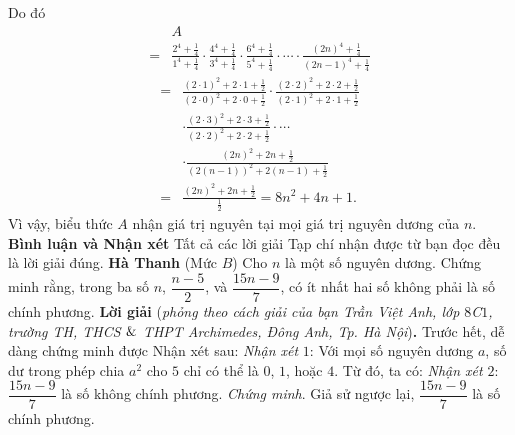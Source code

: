 \begin{multicols}{2}
	\vskip 0.05cm
	Do đó
	\begin{align*}
			&A \\[-0.6ex]
			= &\frac{{{2^4} \!+\! \frac{1}{4}}}{{{1^4} \!+\! \frac{1}{4}}} \!\cdot\! \frac{{{4^4} \!+\! \frac{1}{4}}}{{{3^4} \!+\! \frac{1}{4}}} \!\cdot\! \frac{{{6^4} \!+\! \frac{1}{4}}}{{{5^4} \!+\! \frac{1}{4}}} \cdot  \cdots  \cdot \frac{{{{\left( {2n} \right)}^4} \!+\! \frac{1}{4}}}{{{{\left( {2n \!-\! 1} \right)}^4} \!+\! \frac{1}{4}}}
		\end{align*}
			\begin{align*}
			 = &\frac{{{{\left( {2 \cdot 1} \right)}^2} + 2 \cdot 1 + \frac{1}{2}}}{{{{\left( {2 \cdot 0} \right)}^2} + 2 \cdot 0 + \frac{1}{2}}} \cdot \frac{{{{\left( {2 \cdot 2} \right)}^2} + 2 \cdot 2 + \frac{1}{2}}}{{{{\left( {2 \cdot 1} \right)}^2} + 2 \cdot 1 + \frac{1}{2}}} \\
			 &\cdot \frac{{{{\left( {2 \cdot 3} \right)}^2} + 2 \cdot 3 + \frac{1}{2}}}{{{{\left( {2 \cdot 2} \right)}^2} + 2 \cdot 2 + \frac{1}{2}}} \cdot  \cdots  \\
			 &\cdot \frac{{{{\left( {2n} \right)}^2} + 2n + \frac{1}{2}}}{{{{\left( {2\left( {n - 1} \right)} \right)}^2} + 2\left( {n - 1} \right) + \frac{1}{2}}}\\
			 = &\frac{{{{\left( {2n} \right)}^2} + 2n + \frac{1}{2}}}{{\frac{1}{2}}} = 8{n^2} + 4n + 1.
	\end{align*}
	Vì vậy, biểu thức $A$ nhận giá trị nguyên tại mọi giá trị nguyên dương của $n$.
	\vskip 0.05cm
	\textbf{\color{thachthuctoanhoc}Bình luận và Nhận xét}
	\vskip 0.05cm
	Tất cả các lời giải Tạp chí nhận được từ bạn đọc đều là lời giải đúng.
	\vskip 0.05cm
	\hfill	\textbf{\color{thachthuctoanhoc}Hà Thanh}
	\vskip 0.05cm
	{}
	(Mức $B$) Cho $n$ là một số nguyên dương. Chứng minh rằng, trong ba số $n$,  $\dfrac{n-5}2$, và $\dfrac{15n-9}7$, có ít nhất hai số không phải là số chính phương.
	\vskip 0.05cm
	\textbf{\color{thachthuctoanhoc}Lời giải} (\textit{phỏng theo cách giải của bạn Trần Việt Anh, lớp $8$C$1$, trường TH, THCS $\color{black}\&$ THPT Archimedes, Đông Anh, Tp. Hà Nội})\textbf{\color{thachthuctoanhoc}.}
	\vskip 0.05cm
	Trước hết, dễ dàng chứng minh được Nhận xét sau:
	\vskip 0.05cm
	\textit{Nhận xét} $1$: Với mọi số nguyên dương $a$, số dư trong phép chia $a^2$  cho $5$ chỉ có thể là $0$, $1$, hoặc $4$.
	\vskip 0.05cm
	Từ đó, ta có:
	\vskip 0.05cm
	\textit{Nhận xét} $2$: $\dfrac{15n-9}{7}$  là số không chính phương.
	\vskip 0.05cm
	\textit{Chứng minh}. Giả sử ngược lại, $\dfrac{15n-9}{7}$  là số chính phương.

\end{multicols}
